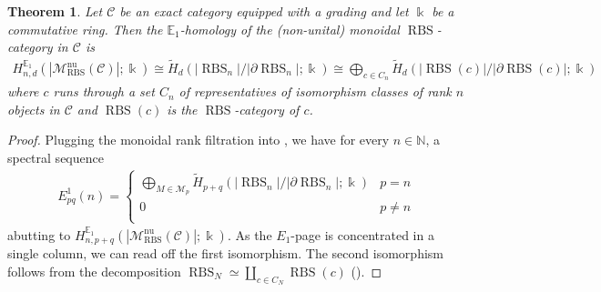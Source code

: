 \documentclass[12pt, reqno]{amsart}
\theoremstyle{plain}
\newtheorem{theorem}{Theorem}[section]
\theoremstyle{definition}
\newcommand{\N}{\mathbb N}
\begin{document}
\begin{theorem}\label{E1-homology for general exact categories}
Let $\mathcal{C}$ be an exact category equipped with a grading and let $\Bbbk$ be a commutative ring. Then the $\mathbb{E}_1$-homology of the (non-unital) monoidal $\operatorname{RBS}$-category in $\mathcal{C}$ is
\begin{align*}
H_{n,d}^{\mathbb{E}_1}(|\mathscr{M}_{\operatorname{RBS}}^{\operatorname{nu}}(\mathcal{C})|;\Bbbk)\cong \tilde{H}_d(|\operatorname{RBS}_n|/|\partial \operatorname{RBS}_n|; \Bbbk) \cong
\bigoplus_{c\in C_n} \tilde{H}_d(|\operatorname{RBS}(c)|/|\partial \operatorname{RBS}(c)|;\Bbbk)
\end{align*}
where $c$ runs through a set $C_n$ of representatives of isomorphism classes of rank $n$ objects in $\mathcal{C}$ and $\operatorname{RBS}(c)$ is the $\operatorname{RBS}$-category of $c$.
\end{theorem}
\begin{proof}
Plugging the monoidal rank filtration into , we have for every $n\in \N$, a spectral sequence
\begin{align*}
E^1_{pq}(n)=\begin{cases}
\bigoplus_{M\in \mathcal{M}_p} \tilde{H}_{p+q}(|\operatorname{RBS}_n|/|\partial \operatorname{RBS}_n|;\Bbbk) & p=n \\
0 & p\neq n \\
\end{cases}
\end{align*}
abutting to $H_{n,p+q}^{\mathbb{E}_1}(|\mathscr{M}_{\operatorname{RBS}}^{\operatorname{nu}}(\mathcal{C})|;\Bbbk)$. As the $E_1$-page is concentrated in a single column, we can read off the first isomorphism. The second isomorphism follows from the decomposition $\operatorname{RBS}_N \simeq \coprod_{c\in C_N} \operatorname{RBS}(c)$ ().
\end{proof}
\end{document}
